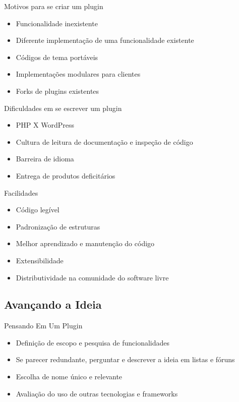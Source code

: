 \documentclass{beamer}
\begin{document}
\begin{frame}{Motivos para se criar um plugin}
\begin{itemize}
  \pause \item Funcionalidade inexistente
  \pause \item Diferente implementação de uma funcionalidade existente
  \pause \item Códigos de tema portáveis
  \pause \item Implementações modulares para clientes
  \pause \item Forks de plugins existentes
\end{itemize}
\end{frame}

\begin{frame}{Dificuldades em se escrever um plugin}
\begin{itemize}
  \pause \item PHP X WordPress
  \pause \item Cultura de leitura de documentação e inspeção de código
  \pause \item Barreira de idioma
  \pause \item Entrega de produtos deficitários
\end{itemize}
\end{frame}

\begin{frame}{Facilidades}
\begin{itemize}
  \pause \item Código legível
  \pause \item Padronização de estruturas
  \pause \item Melhor aprendizado e manutenção do código
  \pause \item Extensibilidade
  \pause \item Distributividade na comunidade do software livre
\end{itemize}
\end{frame}

\subsection{Avançando a Ideia}

\begin{frame}{Pensando Em Um Plugin}
\begin{itemize}
  \pause \item Definição de escopo e pesquisa de funcionalidades
  \pause \item Se parecer redundante, perguntar e descrever a
    ideia em listas e fóruns
  \pause \item Escolha de nome único e relevante
  \pause \item Avaliação do uso de outras tecnologias e frameworks
\end{itemize}
\end{frame}
\end{document}
